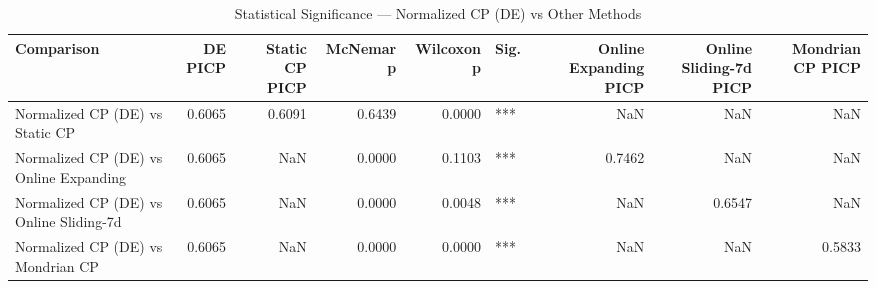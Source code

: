 \begin{table}
\caption{Statistical Significance — Normalized CP (DE) vs Other Methods}
\label{tab:t5d_3_significance}
\begin{tabular}{lrrrrlrrr}
\toprule
Comparison & DE PICP & Static CP PICP & McNemar p & Wilcoxon p & Sig. & Online Expanding PICP & Online Sliding-7d PICP & Mondrian CP PICP \\
\midrule
Normalized CP (DE) vs Static CP & 0.6065 & 0.6091 & 0.6439 & 0.0000 & *** & NaN & NaN & NaN \\
Normalized CP (DE) vs Online Expanding & 0.6065 & NaN & 0.0000 & 0.1103 & *** & 0.7462 & NaN & NaN \\
Normalized CP (DE) vs Online Sliding-7d & 0.6065 & NaN & 0.0000 & 0.0048 & *** & NaN & 0.6547 & NaN \\
Normalized CP (DE) vs Mondrian CP & 0.6065 & NaN & 0.0000 & 0.0000 & *** & NaN & NaN & 0.5833 \\
\bottomrule
\end{tabular}
\end{table}
